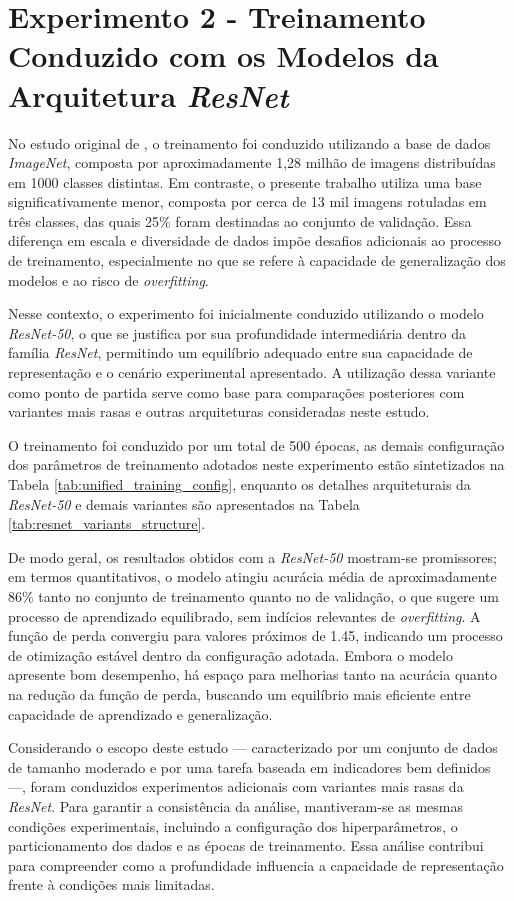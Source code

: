 \section{Experimento 2 - Treinamento Conduzido com os Modelos da Arquitetura \textit{ResNet}}

No estudo original de \cite{he2016}, o treinamento foi conduzido utilizando a base de dados \textit{ImageNet}, composta por aproximadamente 1,28 milhão de imagens distribuídas em 1000 classes distintas. Em contraste, o presente trabalho utiliza uma base significativamente menor, composta por cerca de 13 mil imagens rotuladas em três classes, das quais 25\% foram destinadas ao conjunto de validação. Essa diferença em escala e diversidade de dados impõe desafios adicionais ao processo de treinamento, especialmente no que se refere à capacidade de generalização dos modelos e ao risco de \textit{overfitting}.

Nesse contexto, o experimento foi inicialmente conduzido utilizando o modelo \textit{ResNet-50}, o que se justifica por sua profundidade intermediária dentro da família \textit{ResNet}, permitindo um equilíbrio adequado entre sua capacidade de representação e o cenário experimental apresentado. A utilização dessa variante como ponto de partida serve como base para comparações posteriores com variantes mais rasas e outras arquiteturas consideradas neste estudo.

O treinamento foi conduzido por um total de 500 épocas, as demais configuração dos parâmetros de treinamento adotados neste experimento estão sintetizados na Tabela \ref{tab:unified_training_config}, enquanto os detalhes arquiteturais da \textit{ResNet-50} e demais variantes são apresentados na Tabela \ref{tab:resnet_variants_structure}.

De modo geral, os resultados obtidos com a \textit{ResNet-50} mostram-se promissores; em termos quantitativos, o modelo atingiu acurácia média de aproximadamente 86\% tanto no conjunto de treinamento quanto no de validação, o que sugere um processo de aprendizado equilibrado, sem indícios relevantes de \textit{overfitting}. A função de perda convergiu para valores próximos de 1.45, indicando um processo de otimização estável dentro da configuração adotada. Embora o modelo apresente bom desempenho, há espaço para melhorias tanto na acurácia quanto na redução da função de perda, buscando um equilíbrio mais eficiente entre capacidade de aprendizado e generalização.

Considerando o escopo deste estudo — caracterizado por um conjunto de dados de tamanho moderado e por uma tarefa baseada em indicadores bem definidos —, foram conduzidos experimentos adicionais com variantes mais rasas da \textit{ResNet}. Para garantir a consistência da análise, mantiveram-se as mesmas condições experimentais, incluindo a configuração dos hiperparâmetros, o particionamento dos dados e as épocas de treinamento. Essa análise contribui para compreender como a profundidade influencia a capacidade de representação frente à condições mais limitadas.
 
